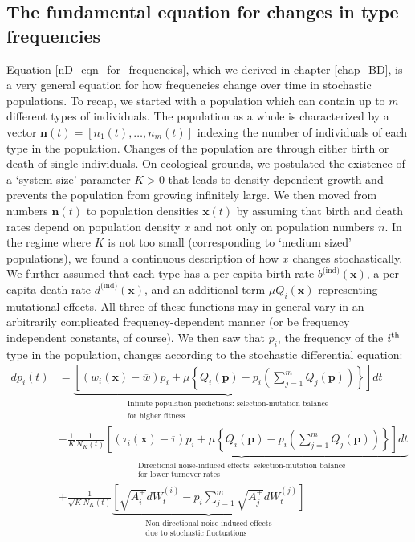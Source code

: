 \subsection{The fundamental equation for changes in type frequencies}\label{sec_fun_theorem_freq}
Equation \eqref{nD_eqn_for_frequencies}, which we derived in chapter \ref{chap_BD}, is a very general equation for how frequencies change over time in stochastic populations. To recap, we started with a population which can contain up to $m$ different types of individuals. The population as a whole is characterized by a vector $\mathbf{n}(t) = [n_1(t), \ldots, n_m(t)]$ indexing the number of individuals of each type in the population. Changes of the population are through either birth or death of single individuals. On ecological grounds, we postulated the existence of a `system-size' parameter $K>0$ that leads to density-dependent growth and prevents the population from growing infinitely large. We then moved from numbers $\mathbf{n}(t)$ to population densities $\mathbf{x}(t)$ by assuming that birth and death rates depend on population density $x$ and not only on population numbers $n$. In the regime where $K$ is not too small (corresponding to `medium sized' populations), we found a continuous description of how $x$ changes stochastically. We further assumed that each type has a per-capita birth rate $b^{\textrm{(ind)}}(\mathbf{x})$, a per-capita death rate $d^{\textrm{(ind)}}(\mathbf{x})$, and an additional term $\mu Q_{i}(\mathbf{x})$ representing mutational effects. All three of these functions may in general vary in an arbitrarily complicated frequency-dependent manner (or be frequency independent constants, of course). We then saw that $p_i$, the frequency of the $i\textsuperscript{th}$ type in the population, changes according to the stochastic differential equation:
\begin{equation}
\label{nD_stochastic_RM}
\begin{aligned}
dp_i(t) &= \underbrace{\left[(w_i(\mathbf{x}) - \overline{w})p_i + \mu\left\{Q_i(\mathbf{p}) - p_i\left(\sum\limits_{j=1}^{m}Q_j(\mathbf{p})\right)\right\}\right]dt}_{\substack{\text{Infinite population predictions: selection-mutation balance} \\ \text{for higher fitness}}}\\
&- \frac{1}{K}\underbrace{\frac{1}{N_{K}(t)}\left[(\tau_i(\mathbf{x}) - \overline{\tau})p_i + \mu\left\{Q_i(\mathbf{p}) - p_i\left(\sum\limits_{j=1}^{m}Q_j(\mathbf{p})\right)\right\}\right]dt}_{\substack{\text{Directional noise-induced effects: selection-mutation balance}\\\text{for lower turnover rates}}}\\
&+ \frac{1}{\sqrt{K}N_{K}(t)}\underbrace{\left[\sqrt{A^{+}_{i}}dW^{(i)}_t - p_i\sum\limits_{j=1}^{m}\sqrt{A^{+}_{j}}dW^{(j)}_t\right]}_{\substack{\text{Non-directional noise-induced effects}\\\text{due to stochastic fluctuations}}}
\end{aligned}
\end{equation}
